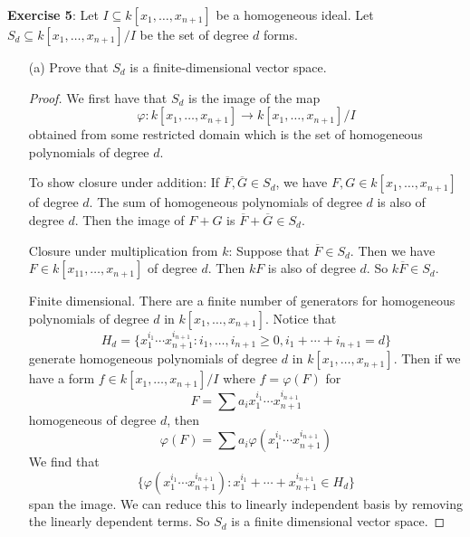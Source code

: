 \documentclass{article}
\begin{document}
\textbf{Exercise 5}: Let $I \subseteq k[x_{1}, \ldots, x_{n + 1}]$ be a homogeneous ideal. Let $S_{d} \subseteq k[x_{1}, \ldots, x_{n + 1}]/I$ be the set of degree $d$ forms.
    \begin{itemize}
        \item [(a)] Prove that $S_{d}$ is a finite-dimensional vector space.
            \begin{proof}
                We first have that $S_{d}$ is the image of the map 
                    \begin{equation*}
                        \varphi : k[x_{1}, \ldots, x_{n + 1}] \rightarrow k[x_{1}, \ldots, x_{n + 1}]/I
                    \end{equation*}
                obtained from some restricted domain which is the set of homogeneous polynomials of degree $d$.

                To show closure under addition: If $\overline{F}, \overline{G} \in S_{d}$, we have $F, G \in k[x_{1}, \ldots, x_{n + 1}]$ of degree $d$. The sum of homogeneous polynomials of degree $d$ is also of degree $d$. Then the image of $F + G$ is $\overline{F} + \overline{G} \in S_{d}$.

                Closure under multiplication from $k$: Suppose that $\overline{F} \in S_{d}$. Then we have $F  \in k[x_{11}, \ldots, x_{n + 1}]$ of degree $d$. Then $kF$ is also of degree $d$. So $k\overline{F} \in S_{d}$.

                Finite dimensional. There are a finite number of generators for homogeneous polynomials of degree $d$ in $k[x_{1}, \ldots, x_{n + 1}]$. Notice that 
                    \begin{equation*}
                        H_{d} = \{x_{1}^{i_{1}} \cdots x_{n + 1}^{i_{n + 1}} : i_{1}, \ldots, i_{n + 1} \geq 0, i_{1} + \cdots+ i_{n + 1} = d\}
                    \end{equation*}
                generate homogeneous polynomials of degree $d$ in $k[x_{1}, \ldots, x_{n + 1}]$. Then if we have a form $f \in k[x_{1}, \ldots, x_{n + 1}]/I$ where $f = \varphi (F)$ for 
                    \begin{equation*}
                        F = \sum a_{i}x_{1}^{i_{1}}\cdots x_{n + 1}^{i_{n + 1}}
                    \end{equation*}
                homogeneous of degree $d$, then 
                    \begin{equation*}
                        \varphi (F) = \sum a_{i}\varphi(x_{1}^{i_{1}} \cdots x_{n + 1}^{i_{n + 1}})
                    \end{equation*}
                We find that 
                    \begin{equation*}
                        \{\varphi (x_{1}^{i_{1}}\cdots x_{n + 1}^{i_{n + 1}}) : x_{1}^{i_{1}} + \cdots + x_{n + 1}^{i_{n + 1}} \in H_{d}\}
                    \end{equation*}
                span the image. We can reduce this to linearly independent basis by removing the linearly dependent terms. So $S_{d}$ is a finite dimensional vector space.
            \end{proof}


\end{itemize}
\end{document}

